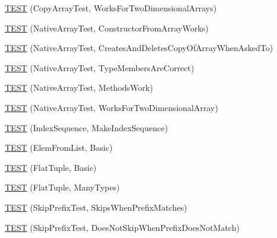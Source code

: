 \begin{DoxyCompactItemize}
\item 
\mbox{\hyperlink{_obj__test_2lib_2googletest-master_2googletest_2test_2gtest__unittest_8cc_a1f1a5d3bb2ce15ff081f359e4494a739}{T\+E\+ST}} (Copy\+Array\+Test, Works\+For\+Two\+Dimensional\+Arrays)
\item 
\mbox{\hyperlink{_obj__test_2lib_2googletest-master_2googletest_2test_2gtest__unittest_8cc_acba0839db5cf02cdbd658b9fb810066b}{T\+E\+ST}} (Native\+Array\+Test, Constructor\+From\+Array\+Works)
\item 
\mbox{\hyperlink{_obj__test_2lib_2googletest-master_2googletest_2test_2gtest__unittest_8cc_a227737052f993da5fe2f3294b7f8d184}{T\+E\+ST}} (Native\+Array\+Test, Creates\+And\+Deletes\+Copy\+Of\+Array\+When\+Asked\+To)
\item 
\mbox{\hyperlink{_obj__test_2lib_2googletest-master_2googletest_2test_2gtest__unittest_8cc_a1f2578d4ac6aeb87d0c7c9574f79ed0c}{T\+E\+ST}} (Native\+Array\+Test, Type\+Members\+Are\+Correct)
\item 
\mbox{\hyperlink{_obj__test_2lib_2googletest-master_2googletest_2test_2gtest__unittest_8cc_a5f14e3d45e8edc2d22d4e98e7c1422b9}{T\+E\+ST}} (Native\+Array\+Test, Methods\+Work)
\item 
\mbox{\hyperlink{_obj__test_2lib_2googletest-master_2googletest_2test_2gtest__unittest_8cc_a148c11619d001fac39dae12428534b00}{T\+E\+ST}} (Native\+Array\+Test, Works\+For\+Two\+Dimensional\+Array)
\item 
\mbox{\hyperlink{_obj__test_2lib_2googletest-master_2googletest_2test_2gtest__unittest_8cc_a387a341993c619b19786b6c5cf589160}{T\+E\+ST}} (Index\+Sequence, Make\+Index\+Sequence)
\item 
\mbox{\hyperlink{_obj__test_2lib_2googletest-master_2googletest_2test_2gtest__unittest_8cc_ac3105a7c9cd40f1dfc07152424fb10dc}{T\+E\+ST}} (Elem\+From\+List, Basic)
\item 
\mbox{\hyperlink{_obj__test_2lib_2googletest-master_2googletest_2test_2gtest__unittest_8cc_a4fd48ea8393706f2dc8f5b3899358a3f}{T\+E\+ST}} (Flat\+Tuple, Basic)
\item 
\mbox{\hyperlink{_obj__test_2lib_2googletest-master_2googletest_2test_2gtest__unittest_8cc_a14e064220d7b23d6823f681fcdaca59e}{T\+E\+ST}} (Flat\+Tuple, Many\+Types)
\item 
\mbox{\hyperlink{_obj__test_2lib_2googletest-master_2googletest_2test_2gtest__unittest_8cc_a0c38bd27f49371439ed463c1bb44f444}{T\+E\+ST}} (Skip\+Prefix\+Test, Skips\+When\+Prefix\+Matches)
\item 
\mbox{\hyperlink{_obj__test_2lib_2googletest-master_2googletest_2test_2gtest__unittest_8cc_afeb79bbd7756bbeca262cb79315856a4}{T\+E\+ST}} (Skip\+Prefix\+Test, Does\+Not\+Skip\+When\+Prefix\+Does\+Not\+Match)

\end{DoxyCompactItemize}
